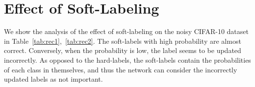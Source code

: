 \documentclass[10pt,twocolumn,letterpaper]{article}
\newcommand{\Tref}[1]{Table~\ref{#1}}
\begin{document}
\begin{table}[bt]
  \caption{Validation accuracy with different $t_1$ (start epoch) and $t_2$ (stop epoch) in the triple test (experimented on SN-CIFAR with noise rate $=0.7$, $\alpha=1.2$, $\beta=0.8$, learning rate = 0.08).}
  \centering
  \label{tab:begin2}
\end{table}

\newpage
\section{Effect of Soft-Labeling}\label{sec:effect}
We show the analysis of the effect of soft-labeling on the noisy CIFAR-10 dataset in \Tref{tab:rec1},~\ref{tab:rec2}.
The soft-labels with high probability are almost correct.
Conversely, when the probability is low, the label seems to be updated incorrectly. As opposed to the hard-labels, the soft-labels contain the probabilities of each class in themselves, and thus the network can consider the incorrectly updated labels as not important.

\begin{table}[h]
  \caption{Recovery accuracies of the updated soft-labels whose maximum probabilities $p$ are within each range (experimented on AN-CIFAR with noise rate $=0.4$).}
  \centering
  \label{tab:rec1}
\end{table}
\end{document}
